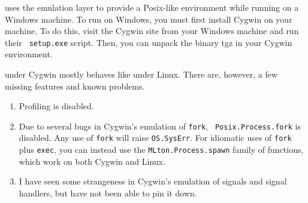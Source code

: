 
{\mlton} uses the  emulation
layer to provide a Posix-like environment while running on a Windows machine.
To run {\mlton} on Windows, you must first install Cygwin on your machine.  To
do this, visit the Cygwin site from your Windows machine and run their {\tt
setup.exe} script.  Then, you can unpack the {\mlton} binary tgz in your Cygwin
environment.

{\mlton} under Cygwin mostly behaves like {\mlton} under Linux.  There are,
however, a few missing features and known problems.

\begin{enumerate}

\item Profiling is disabled.

\item Due to several bugs in Cygwin's emulation of {\tt fork}, {\tt
Posix.Process.fork} is disabled.  Any use of {\tt fork} will raise
{\tt OS.SysErr}.  For idiomatic uses of {\tt fork} plus {\tt exec},
you can instead use the {\tt MLton.Process.spawn} family of functions, which
work on both Cygwin and Linux.

\item I have seen some strangeness in Cygwin's emulation of signals and
signal handlers, but have not been able to pin it down.

\end{enumerate}


